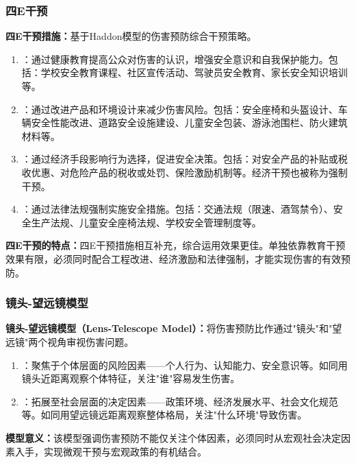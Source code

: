 \subsubsection{四E干预}

\begin{keybox}
\textbf{四E干预措施：}基于Haddon模型的伤害预防综合干预策略。

\begin{enumerate}[leftmargin=*]
    \item {}：通过健康教育提高公众对伤害的认识，增强安全意识和自我保护能力。包括：学校安全教育课程、社区宣传活动、驾驶员安全教育、家长安全知识培训等。

    \item {}：通过改进产品和环境设计来减少伤害风险。包括：安全座椅和头盔设计、车辆安全性能改进、道路安全设施建设、儿童安全包装、游泳池围栏、防火建筑材料等。

    \item {}：通过经济手段影响行为选择，促进安全决策。包括：对安全产品的补贴或税收优惠、对危险产品的税收或处罚、保险激励机制等。经济干预也被称为强制干预。

    \item {}：通过法律法规强制实施安全措施。包括：交通法规（限速、酒驾禁令）、安全生产法规、儿童安全座椅法规、学校安全管理制度等。
\end{enumerate}

\textbf{四E干预的特点：}四E干预措施相互补充，综合运用效果更佳。单独依靠教育干预效果有限，必须同时配合工程改进、经济激励和法律强制，才能实现伤害的有效预防。
\end{keybox}

\subsubsection{镜头-望远镜模型}

\begin{defbox}
\textbf{镜头-望远镜模型（Lens-Telescope Model）：}将伤害预防比作通过"镜头"和"望远镜"两个视角审视伤害问题。

\begin{enumerate}[leftmargin=*]
    \item {}：聚焦于个体层面的风险因素——个人行为、认知能力、安全意识等。如同用镜头近距离观察个体特征，关注"谁"容易发生伤害。

    \item {}：拓展至社会层面的决定因素——政策环境、经济发展水平、社会文化规范等。如同用望远镜远距离观察整体格局，关注"什么环境"导致伤害。
\end{enumerate}

\textbf{模型意义：}该模型强调伤害预防不能仅关注个体因素，必须同时从宏观社会决定因素入手，实现微观干预与宏观政策的有机结合。
\end{defbox}


